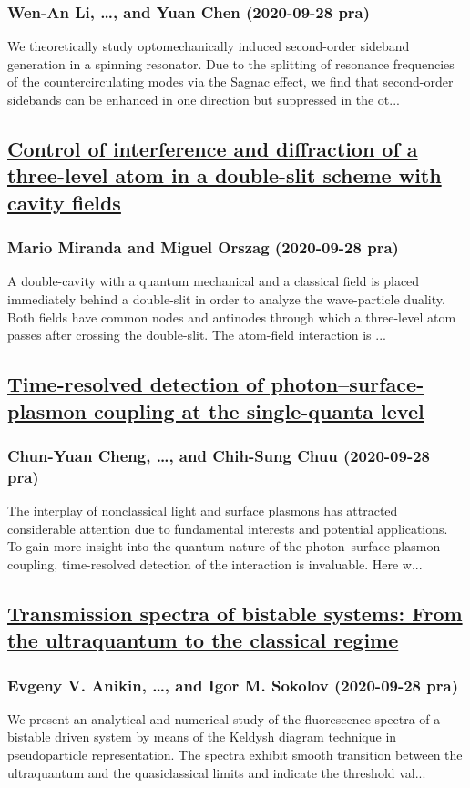 \subsubsection*{Wen-An Li, \dots, and Yuan Chen (2020-09-28 pra)}
We theoretically study optomechanically induced second-order sideband generation in a spinning resonator. Due to the splitting of resonance frequencies of the countercirculating modes via the Sagnac effect, we find that second-order sidebands can be enhanced in one direction but suppressed in the ot...
\subsection*{\href{http://link.aps.org/doi/10.1103/PhysRevA.102.033723}{Control of interference and diffraction of a three-level atom in a double-slit scheme with cavity fields}}
\subsubsection*{Mario Miranda and Miguel Orszag (2020-09-28 pra)}
A double-cavity with a quantum mechanical and a classical field is placed immediately behind a double-slit in order to analyze the wave-particle duality. Both fields have common nodes and antinodes through which a three-level atom passes after crossing the double-slit. The atom-field interaction is ...
\subsection*{\href{http://link.aps.org/doi/10.1103/PhysRevA.102.033724}{Time-resolved detection of photon–surface-plasmon coupling at the single-quanta level}}
\subsubsection*{Chun-Yuan Cheng, \dots, and Chih-Sung Chuu (2020-09-28 pra)}
The interplay of nonclassical light and surface plasmons has attracted considerable attention due to fundamental interests and potential applications. To gain more insight into the quantum nature of the photon–surface-plasmon coupling, time-resolved detection of the interaction is invaluable. Here w...
\subsection*{\href{http://link.aps.org/doi/10.1103/PhysRevA.102.033725}{Transmission spectra of bistable systems: From the ultraquantum to the classical regime}}
\subsubsection*{Evgeny V. Anikin, \dots, and Igor M. Sokolov (2020-09-28 pra)}
We present an analytical and numerical study of the fluorescence spectra of a bistable driven system by means of the Keldysh diagram technique in pseudoparticle representation. The spectra exhibit smooth transition between the ultraquantum and the quasiclassical limits and indicate the threshold val...
